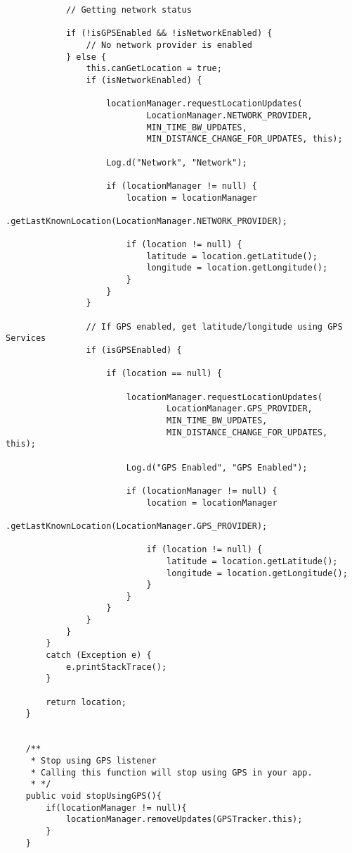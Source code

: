 \begin{lstlisting}
            // Getting network status

            if (!isGPSEnabled && !isNetworkEnabled) {
                // No network provider is enabled
            } else {
                this.canGetLocation = true;
                if (isNetworkEnabled) {

                    locationManager.requestLocationUpdates(
                            LocationManager.NETWORK_PROVIDER,
                            MIN_TIME_BW_UPDATES,
                            MIN_DISTANCE_CHANGE_FOR_UPDATES, this);

                    Log.d("Network", "Network");

                    if (locationManager != null) {
                        location = locationManager
                                .getLastKnownLocation(LocationManager.NETWORK_PROVIDER);

                        if (location != null) {
                            latitude = location.getLatitude();
                            longitude = location.getLongitude();
                        }
                    }
                }

                // If GPS enabled, get latitude/longitude using GPS Services
                if (isGPSEnabled) {

                    if (location == null) {

                        locationManager.requestLocationUpdates(
                                LocationManager.GPS_PROVIDER,
                                MIN_TIME_BW_UPDATES,
                                MIN_DISTANCE_CHANGE_FOR_UPDATES, this);

                        Log.d("GPS Enabled", "GPS Enabled");

                        if (locationManager != null) {
                            location = locationManager
                                    .getLastKnownLocation(LocationManager.GPS_PROVIDER);

                            if (location != null) {
                                latitude = location.getLatitude();
                                longitude = location.getLongitude();
                            }
                        }
                    }
                }
            }
        }
        catch (Exception e) {
            e.printStackTrace();
        }

        return location;
    }


    /**
     * Stop using GPS listener
     * Calling this function will stop using GPS in your app.
     * */
    public void stopUsingGPS(){
        if(locationManager != null){
            locationManager.removeUpdates(GPSTracker.this);
        }
    }



\end{lstlisting}
